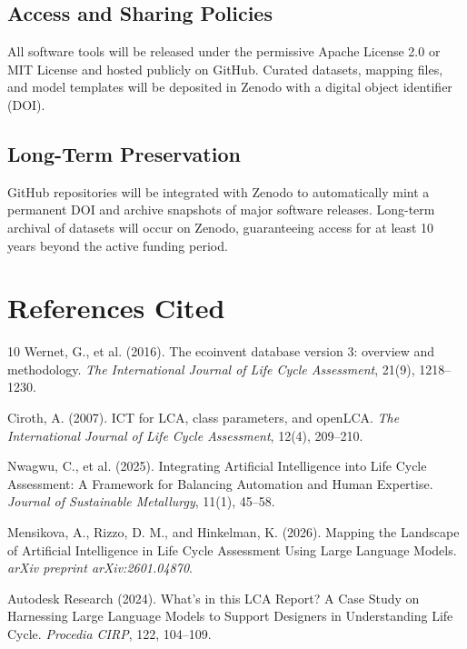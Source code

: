 \documentclass[11pt]{article}
\begin{document}
\subsection{Access and Sharing Policies}
All software tools will be released under the permissive Apache License 2.0 or MIT License and hosted publicly on GitHub. Curated datasets, mapping files, and model templates will be deposited in Zenodo with a digital object identifier (DOI).

\subsection{Long-Term Preservation}
GitHub repositories will be integrated with Zenodo to automatically mint a permanent DOI and archive snapshots of major software releases. Long-term archival of datasets will occur on Zenodo, guaranteeing access for at least 10 years beyond the active funding period.

\newpage
\section{References Cited}
\begin{thebibliography}{10}
Wernet, G., et al. (2016). The ecoinvent database version 3: overview and methodology. \textit{The International Journal of Life Cycle Assessment}, 21(9), 1218--1230.

Ciroth, A. (2007). ICT for LCA, class parameters, and openLCA. \textit{The International Journal of Life Cycle Assessment}, 12(4), 209--210.

Nwagwu, C., et al. (2025). Integrating Artificial Intelligence into Life Cycle Assessment: A Framework for Balancing Automation and Human Expertise. \textit{Journal of Sustainable Metallurgy}, 11(1), 45--58.

Mensikova, A., Rizzo, D. M., and Hinkelman, K. (2026). Mapping the Landscape of Artificial Intelligence in Life Cycle Assessment Using Large Language Models. \textit{arXiv preprint arXiv:2601.04870}.

Autodesk Research (2024). What's in this LCA Report? A Case Study on Harnessing Large Language Models to Support Designers in Understanding Life Cycle. \textit{Procedia CIRP}, 122, 104--109.
\end{thebibliography}
\end{document}
